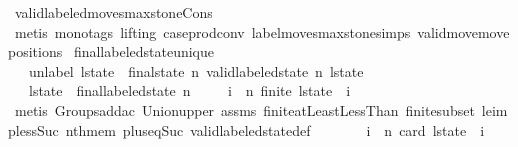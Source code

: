 \begin{isabellebody}
\ valid{\isacharunderscore}labeled{\isacharunderscore}moves{\isacharunderscore}max{\isacharunderscore}stone{\isacharunderscore}Cons\isanewline
\ \ \ \ \isamarkupfalse%
\ {\isacharparenleft}metis\ {\isacharparenleft}mono{\isacharunderscore}tags{\isacharcomma}\ lifting{\isacharparenright}\ case{\isacharunderscore}prod{\isacharunderscore}conv\ label{\isacharunderscore}moves{\isacharunderscore}max{\isacharunderscore}stone{\isachardot}simps{\isacharparenleft}{}{\isacharparenright}\ valid{\isacharunderscore}move{\isacharprime}{\isacharunderscore}move{\isacharunderscore}positions{\isacharparenright}\isanewline
{}\isamarkupfalse%
%
\endisatagproof
{\isafoldproof}%
%
\isadelimproof
\isanewline
%
\endisadelimproof
\isanewline
{}\isamarkupfalse%
\ final{\isacharunderscore}labeled{\isacharunderscore}state{\isacharunderscore}unique{\isacharcolon}\isanewline
\ \ \ {\isachardoublequoteopen}unlabel\ l{\isacharunderscore}state\ {\isacharequal}\ final{\isacharunderscore}state\ n{\isachardoublequoteclose}\ {\isachardoublequoteopen}valid{\isacharunderscore}labeled{\isacharunderscore}state\ n\ l{\isacharunderscore}state{\isachardoublequoteclose}\isanewline
\ \ \ {\isachardoublequoteopen}l{\isacharunderscore}state\ {\isacharequal}\ final{\isacharunderscore}labeled{\isacharunderscore}state\ n{\isachardoublequoteclose}\isanewline
%
\isadelimproof
%
\endisadelimproof
%
\isatagproof
{}\isamarkupfalse%
{\isacharminus}\isanewline
\ \ \isamarkupfalse%
\ {\isachardoublequoteopen}{\isasymforall}\ i\ {\isasymle}\ n{\isachardot}\ finite\ {\isacharparenleft}l{\isacharunderscore}state\ {\isacharbang}\ i{\isacharparenright}{\isachardoublequoteclose}\isanewline
\ \ \ \ \isamarkupfalse%
\ {\isacharparenleft}metis\ Groups{\isachardot}add{\isacharunderscore}ac{\isacharparenleft}{}{\isacharparenright}\ Union{\isacharunderscore}upper\ assms{\isacharparenleft}{}{\isacharparenright}\ finite{\isacharunderscore}atLeastLessThan\ finite{\isacharunderscore}subset\ le{\isacharunderscore}imp{\isacharunderscore}less{\isacharunderscore}Suc\ nth{\isacharunderscore}mem\ plus{\isacharunderscore}{}{\isacharunderscore}eq{\isacharunderscore}Suc\ valid{\isacharunderscore}labeled{\isacharunderscore}state{\isacharunderscore}def{\isacharparenright}\isanewline
\ \ \isamarkupfalse%
\isanewline
\ \ \isamarkupfalse%
\ {\isachardoublequoteopen}{\isasymforall}\ i\ {\isacharless}\ n{\isachardot}\ card\ {\isacharparenleft}l{\isacharunderscore}state\ {\isacharbang}\ i{\isacharparenright}\ {\isacharequal}\ {}{\isachardoublequoteclose}\isanewline

\end{isabellebody}
